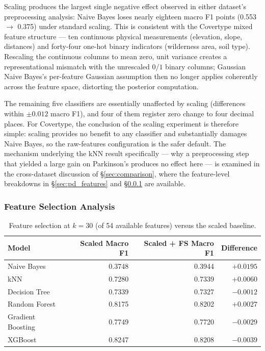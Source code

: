 \documentclass[11pt,a4paper]{article}
\begin{document}
Scaling produces the largest single negative effect observed in either
dataset's preprocessing analysis: Naive Bayes loses nearly eighteen macro F1
points (0.553 $\to$ 0.375) under standard scaling. This is consistent with
the Covertype mixed feature structure --- ten continuous physical
measurements (elevation, slope, distances) and forty-four one-hot binary
indicators (wilderness area, soil type). Rescaling the continuous columns to
mean zero, unit variance creates a representational mismatch with the
unrescaled $0/1$ binary columns; Gaussian Naive Bayes's per-feature Gaussian
assumption then no longer applies coherently across the feature space,
distorting the posterior computation.

The remaining five classifiers are essentially unaffected by scaling
(differences within $\pm 0.012$ macro F1), and four of them register zero
change to four decimal places. For Covertype, the conclusion of the
scaling experiment is therefore simple: scaling provides no benefit to any
classifier and substantially damages Naive Bayes, so the raw-features
configuration is the safer default. The mechanism underlying the kNN result
specifically --- why a preprocessing step that yielded a large gain on
Parkinson's produces no effect here --- is examined in the cross-dataset
discussion of \S\ref{sec:comparison}, where the feature-level breakdowns in
\S\ref{sec:pd_features} and \S\ref{sec:ct_features} are available.

\subsubsection{Feature Selection Analysis}\label{sec:ct_features}

\begin{table}[H]
    \centering
    \caption{Feature selection at $k = 30$ (of 54 available features) versus
    the scaled baseline.}
    \label{tab:ct_feature_selection}
    \begin{tabular}{lrrr}
        \toprule
        Model              & Scaled Macro F1 & Scaled + FS Macro F1 & Difference \\
        \midrule
        Naive Bayes        & 0.3748 & 0.3944 & $+0.0195$ \\
        kNN                & 0.7280 & 0.7339 & $+0.0060$ \\
        Decision Tree      & 0.7339 & 0.7327 & $-0.0012$ \\
        Random Forest      & 0.8175 & 0.8202 & $+0.0027$ \\
        Gradient Boosting  & 0.7749 & 0.7720 & $-0.0029$ \\
        XGBoost            & 0.8247 & 0.8208 & $-0.0039$ \\
        \bottomrule
    \end{tabular}
\end{table}
\end{document}
